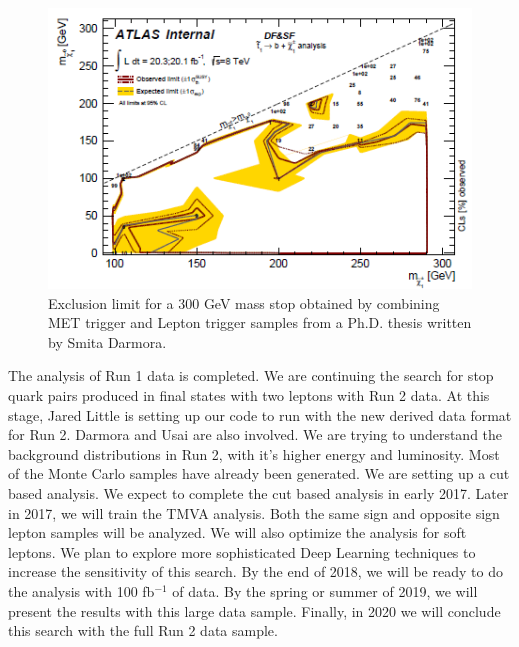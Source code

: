 \begin{figure}[hbt]
\begin{center}
  \includegraphics[width=5in]{De/smita_limit.png}
  \caption{Exclusion limit for a 300 GeV mass stop obtained by combining MET trigger and Lepton trigger samples from a Ph.D.  thesis written by Smita Darmora.}
  \label{smita_limit}
\end{center}
\end{figure}

The analysis of Run 1 data is completed. We are continuing the search for stop quark pairs produced in final states with two leptons with Run 2 data. At this stage, Jared Little is setting up our code to run with the new derived data format for Run 2. Darmora and Usai are also involved. We are trying to understand the background distributions in Run 2, with it's higher energy and luminosity. Most of the Monte Carlo samples have already been generated. We are setting up a cut based analysis. We expect to complete the cut based analysis in early 2017. Later in 2017, we will train the TMVA analysis. Both the same sign and opposite sign lepton samples will be analyzed. We will also optimize the analysis for soft leptons. We plan to explore more sophisticated Deep Learning techniques to increase the sensitivity of this search. By the end of 2018, we will be ready to do the analysis with 100 fb$^{-1}$ of data. By the spring or summer of 2019, we will present the results with this large data sample. Finally, in 2020 we will conclude this search with the full Run 2 data sample.
